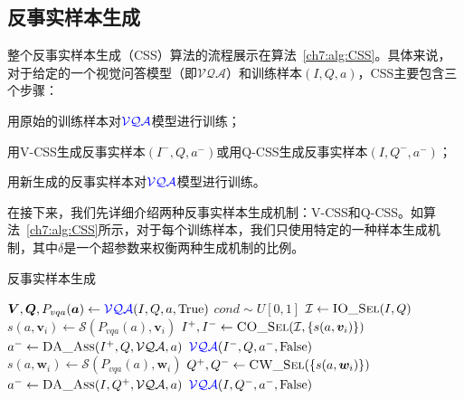 \subsection{反事实样本生成} \label{ch7:sec:css}
整个反事实样本生成（CSS）算法的流程展示在算法~\ref{ch7:alg:CSS}。具体来说，对于给定的一个视觉问答模型（即$\mathcal{VQA}$）和训练样本$(I, Q, a)$，CSS主要包含三个步骤：

\begin{asparaenum}
\item 用原始的训练样本对$\mathcal{\textcolor{blue}{VQA}}$模型进行训练；

\item 用V-CSS生成反事实样本$(I^-, Q, a^-)$或用Q-CSS生成反事实样本$(I, Q^-, a^-)$；

\item 用新生成的反事实样本对$\mathcal{\textcolor{blue}{VQA}}$模型进行训练。
\end{asparaenum}

在接下来，我们先详细介绍两种反事实样本生成机制：V-CSS和Q-CSS。如算法~\ref{ch7:alg:CSS}所示，对于每个训练样本，我们只使用特定的一种样本生成机制，其中$\delta$是一个超参数来权衡两种生成机制的比例。


\begin{algorithm}[tbp]
    \caption{反事实样本生成}\label{ch7:alg:CSS}
    \begin{algorithmic}[1]
        \State $ \bm{V}, \bm{Q}, P_{vqa}(\bm{a}) \leftarrow \mathcal{\textcolor{blue}{VQA}}(I, Q, a, \text{True})$
        \State $ cond \sim U[0, 1]$
          
            \State $ \mathcal{I} \leftarrow  \textsc{IO\_Sel}(I, Q) $
            \State $ s(a, \bm{v}_i) \leftarrow \mathcal{S}(P_{vqa}(a), \bm{v}_i)$
            \State $ I^+, I^- \leftarrow \textsc{CO\_Sel}(\mathcal{I}, \{s(a, \bm{v}_i) \}) $
            \State $ a^- \leftarrow \textsc{DA\_Ass}(I^+, Q, \mathcal{VQA}, a) $
            \State $ \mathcal{\textcolor{blue}{VQA}}(I^-, Q, a^-, \text{False})$
        \Else {}
            \State $ s(a, \bm{w}_i) \leftarrow \mathcal{S}(P_{vqa}(a), \bm{w}_i) $
            \State $ Q^+, Q^- \leftarrow \textsc{CW\_Sel}(\{s(a, \bm{w}_i)\})$
            \State $ a^- \leftarrow \textsc{DA\_Ass}(I, Q^+, \mathcal{VQA}, a) $
            \State $ \mathcal{\textcolor{blue}{VQA}}(I, Q^-, a^-, \text{False})$
        \EndIf
        \EndFunction
    \end{algorithmic}
\end{algorithm}


